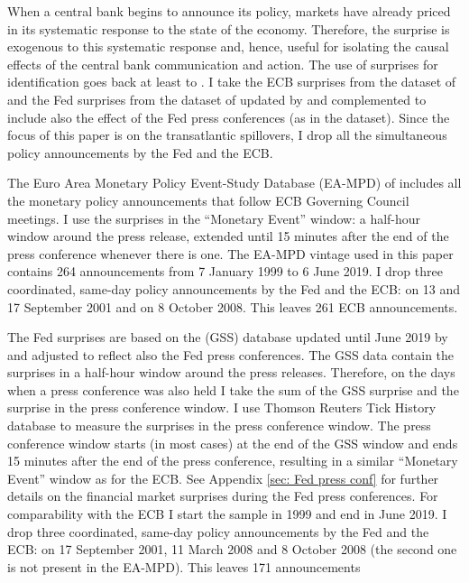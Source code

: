 \documentclass[a4paper,12pt]{article}
\begin{document}
When a central bank begins to announce its policy, markets have already priced in its systematic response
to the state of the economy. 
Therefore, the surprise is exogenous to this systematic response and, hence, useful for isolating the causal effects of the central bank communication and action.
The use of surprises for identification goes back at least to \cite{Kuttner_2001}. I
take the ECB surprises from the dataset of \cite{Altavilla_etal_2019}
and the Fed surprises from the dataset of \cite{Gurkaynak_Sack_Swanson_2005a} updated by \cite{Gurkaynak_Karasoy_Lee_2021} and
complemented to include also the effect of the Fed press conferences (as in the \citealt{Altavilla_etal_2019} dataset).
Since the focus of this paper is on the transatlantic spillovers, I drop all the simultaneous policy announcements
by the Fed and the ECB.

The Euro Area Monetary Policy Event-Study Database (EA-MPD) of \cite{Altavilla_etal_2019}
includes all the monetary policy announcements that follow ECB Governing Council meetings.
I use the surprises in the ``Monetary Event'' window: a half-hour window around the press release, extended until 15 minutes after the end of the press conference whenever there is one.
The EA-MPD vintage used in this paper contains 264 announcements from 7 January 1999 to 6 June 2019. I drop three coordinated, same-day policy announcements by the Fed and the ECB: on 13 and 17 September 2001 and on 8 October 2008. This leaves 261 ECB announcements.

The Fed surprises are based on the \cite{Gurkaynak_Sack_Swanson_2005a} (GSS) database
updated until June 2019 by \cite{Gurkaynak_Karasoy_Lee_2021}
and adjusted to reflect also the Fed press conferences.
The GSS data contain the surprises in a half-hour window around the press releases.
Therefore, on the days when a press conference was also held I take the sum of the GSS surprise and the surprise in the press conference window.
I use Thomson Reuters Tick History database to measure
the surprises in the press conference window. 
The press conference window starts (in most cases) at the end of the GSS window and 
ends 15 minutes after the end of the press conference,
resulting in a similar ``Monetary Event'' window as for the ECB.
See Appendix \ref{sec: Fed press conf} for further details on the financial market surprises during the Fed press conferences.
For comparability with the ECB I start the sample in 1999 and end in June 2019. I drop three coordinated, same-day policy announcements by the Fed and the ECB: on 17 September 2001, 11 March 2008 and 8 October 2008 (the second one is not present in the EA-MPD). This leaves 171 announcements
\end{document}
